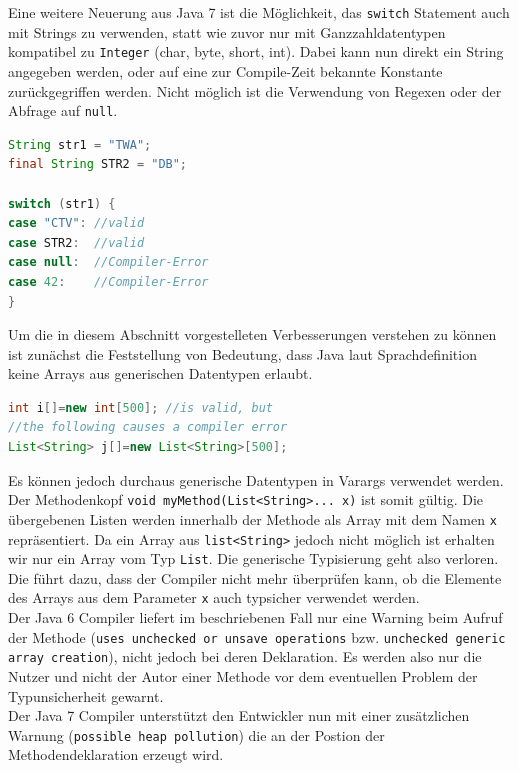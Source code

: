 \documentclass[times, 10pt,twocolumn]{article}
\begin{document}
Eine weitere Neuerung aus Java 7 ist die Möglichkeit, das \texttt{switch} Statement auch mit Strings zu verwenden, statt wie
zuvor nur mit Ganzzahldatentypen kompatibel zu \texttt{Integer} (char, byte, short, int). Dabei kann nun direkt ein String
angegeben werden, oder auf eine zur Compile-Zeit bekannte Konstante zurückgegriffen werden. Nicht möglich ist die Verwendung
von Regexen oder der Abfrage auf \texttt{null}.\cite{javainsel2}

\begin{lstlisting}[language=java,breaklines=true]
String str1 = "TWA";
final String STR2 = "DB";

switch (str1) {
case "CTV": //valid
case STR2:  //valid
case null:  //Compiler-Error
case 42:	//Compiler-Error
}
\end{lstlisting}

Um die in diesem Abschnitt vorgestelleten Verbesserungen verstehen zu können ist zunächst die Feststellung von Bedeutung, dass Java laut Sprachdefinition keine Arrays aus generischen Datentypen erlaubt.
\begin{lstlisting}[language=java,breaklines=true]
int i[]=new int[500]; //is valid, but
//the following causes a compiler error
List<String> j[]=new List<String>[500];
\end{lstlisting}
Es können jedoch durchaus generische Datentypen in Varargs verwendet werden. Der Methodenkopf \texttt{void myMethod(List<String>... x)} ist somit gültig. Die übergebenen Listen werden innerhalb der Methode als Array mit dem Namen \texttt{x} repräsentiert. Da ein Array aus \texttt{list<String>} jedoch nicht möglich ist erhalten wir nur ein Array vom Typ \texttt{List}. Die generische Typisierung geht also verloren.\\

Die führt dazu, dass der Compiler nicht mehr überprüfen kann, ob die Elemente des Arrays aus dem Parameter \texttt{x} auch typsicher verwendet werden.\cite{v2bJava7}\\

Der Java 6 Compiler liefert im beschriebenen Fall nur eine Warning beim Aufruf der Methode (\texttt{uses unchecked or unsave operations} bzw. \texttt{unchecked generic array creation}), nicht jedoch bei deren Deklaration. Es werden also nur die Nutzer und nicht der Autor einer Methode vor dem eventuellen Problem der Typunsicherheit gewarnt.\\

Der Java 7 Compiler unterstützt den Entwickler nun mit einer zusätzlichen Warnung (\texttt{possible heap pollution}) die an der Postion der Methodendeklaration erzeugt wird.\\
\end{document}
